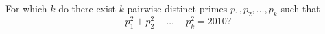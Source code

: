 For which $k$ do there exist $k$ pairwise distinct primes $p_1,p_2,\ldots ,p_k$ such that\[p_1^2+p_2^2+\ldots +p_k^2=2010? \]